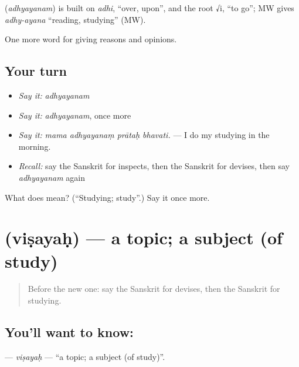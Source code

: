 \begin{cousinweb}
\textbf{} (\emph{adhyayanam}) is built on \emph{adhi}, \textquotedblleft{}over, upon\textquotedblright{}, and the root √i, \textquotedblleft{}to go\textquotedblright{}; MW gives \emph{adhy-ayana} \textquotedblleft{}reading, studying\textquotedblright{} (MW).
\end{cousinweb}

\begin{grammarlens}[title={What you've built}]
One more word for giving reasons and opinions.
\end{grammarlens}

\subsection*{Your turn}
\begin{itemize}
\raggedright
  \item \emph{Say it:} \emph{adhyayanam}
  \item \emph{Say it:} \emph{adhyayanam}, once more
  \item \emph{Say it:} \emph{mama adhyayanaṃ prātaḥ bhavati.} — I do my studying in the morning.
  \item \emph{Recall:} say the Sanskrit for inspects, then the Sanskrit for devises, then say \emph{adhyayanam} again
\end{itemize}

\begin{tcolorbox}[breakable,colback=teal!4,colframe=teal!35!black,title={Before you move on}]
What does  mean? (\textquotedblleft{}Studying; study\textquotedblright{}.) Say it once more.
\end{tcolorbox}
\section[\texorpdfstring{\sk{विषयः} (viṣayaḥ)}{विषयः (viṣayaḥ)}]{ (viṣayaḥ) — a topic; a subject (of study)}

\label{lesson:SA-C363-visayah}



\begin{quote}
Before the new one: say the Sanskrit for devises, then the Sanskrit for studying.
\end{quote}

\subsection*{You'll want to know: }
\textbf{} — \emph{viṣayaḥ} — \textquotedblleft{}a topic; a subject (of study)\textquotedblright{}.

